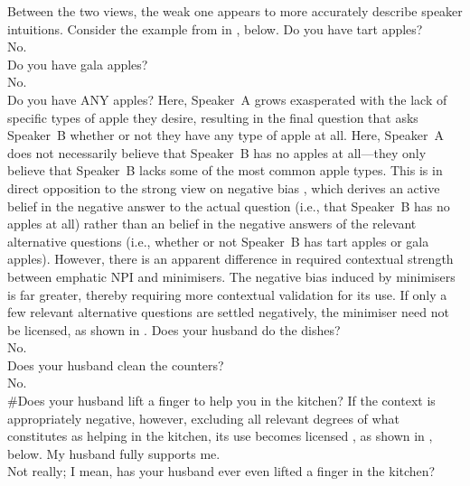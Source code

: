 Between the two views, the weak one appears to more accurately describe speaker intuitions. Consider the example from \textcite{Jeong2021} in , below.
\ex{}\label{ex:fruitstand}%
Do you have tart apples?\\
No.\\
Do you have gala apples?\\
No.\\
Do you have ANY apples?\hfill\parencite[p.~4]{Jeong2021}
\xe
Here, Speaker~A grows exasperated with the lack of specific types of apple they desire, resulting in the final question that asks Speaker~B whether or not they have any type of apple at all. Here, Speaker~A does not necessarily believe that Speaker~B has no apples at all---they only believe that Speaker~B lacks some of the most common apple types. This is in direct opposition to the strong view on negative bias \parencite[see][]{Jeong2020}, which derives an active belief in the negative answer to the actual question (i.e., that Speaker~B has no apples at all) rather than an belief in the negative answers of the relevant alternative questions (i.e., whether or not Speaker~B has tart apples or gala apples). However, there is an apparent difference in required contextual strength between emphatic NPI and minimisers. The negative bias induced by minimisers is far greater, thereby requiring more contextual validation for its use. If only a few relevant alternative questions are settled negatively, the minimiser need not be licensed, as shown in .
\ex{}\label{ex:badminimiserQ}%
\phantom{\#}Does your husband do the dishes?\\
\phantom{\#}No.\\
\phantom{\#}Does your husband clean the counters?\\
\phantom{\#}No.\\
\#Does your husband lift a finger to help you in the kitchen?
\xe
If the context is appropriately negative, however, excluding all relevant degrees of what constitutes as helping in the kitchen, its use becomes licensed \parencite{vanRooij2003,Jeong2021,Jeong2022}, as shown in , below.
\ex{}\label{ex:goodminimiserQ}%
My husband fully supports me.\\
Not really; I mean, has your husband ever even lifted a finger in the kitchen?
\xe

